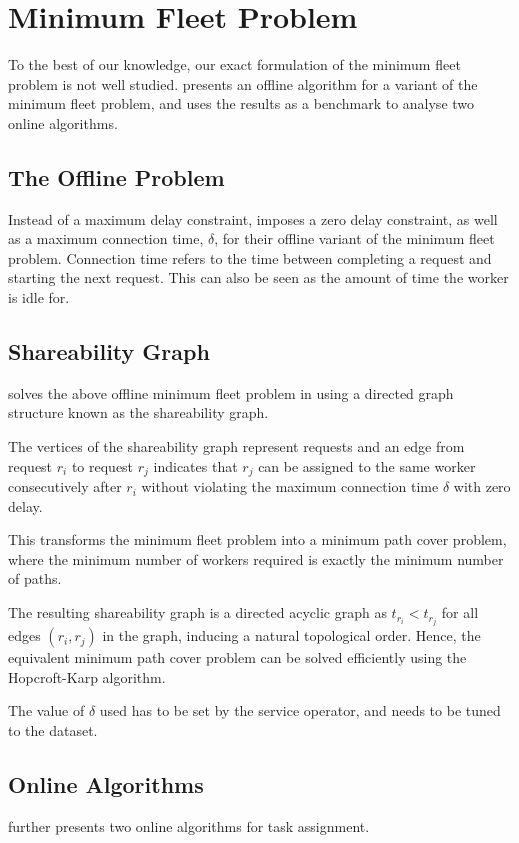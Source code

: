 \documentclass[urop]{socreport}
\begin{document}
\section{Minimum Fleet Problem}
To the best of our knowledge, our exact formulation of the minimum fleet problem is not well studied. \cite{nature} presents an offline algorithm for a variant of the minimum fleet problem, and uses the results as a benchmark to analyse two online algorithms.

\subsection{The Offline Problem}
Instead of a maximum delay constraint, \cite{nature} imposes a zero delay constraint, as well as a maximum connection time, $\delta$, for their offline variant of the minimum fleet problem. Connection time refers to the time between completing a request and starting the next request. This can also be seen as the amount of time the worker is idle for. 

\subsection{Shareability Graph}
\cite{nature} solves the above offline minimum fleet problem in using a directed graph structure known as the shareability graph.

The vertices of the shareability graph represent requests and an edge from request $r_i$ to request $r_j$ indicates that $r_j$ can be assigned to the same worker consecutively after $r_i$ without violating the maximum connection time $\delta$ with zero delay.

This transforms the minimum fleet problem into a minimum path cover problem, where the minimum number of workers required is exactly the minimum number of paths.

The resulting shareability graph is a directed acyclic graph as $t_{r_i} < t_{r_j}$ for all edges $(r_i, r_j)$ in the graph, inducing a natural topological order. Hence, the equivalent minimum path cover problem can be solved efficiently using the Hopcroft-Karp algorithm.

The value of $\delta$ used has to be set by the service operator, and needs to be tuned to the dataset.  

\subsection{Online Algorithms}
\cite{nature} further presents two online algorithms for task assignment.
\end{document}
